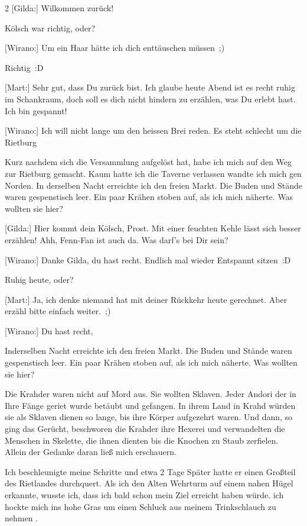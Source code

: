 \documentclass[10pt, a4paper, oneside]{book}
\begin{document}
\begin{multicols}{2}
[Gilda:] Wilkommen zurück!

Kölsch war richtig, oder?

[Wirano:] Um ein Haar hätte ich dich enttäuschen müssen ;)

Richtig :D

[Mart:] Sehr gut, dass Du zurück bist. Ich glaube heute Abend ist es recht ruhig im Schankraum, doch soll es dich nicht hindern zu erzählen, was Du erlebt hast. Ich bin gespannt!

[Wirano:] Ich will nicht lange um den heissen Brei reden. Es steht schlecht um die Rietburg

Kurz nachdem sich die Versammlung aufgelöst hat, habe ich mich auf den Weg zur Rietburg gemacht. Kaum hatte ich die Taverne verlassen wandte ich mich gen Norden. In derselben Nacht erreichte ich den freien Markt. Die Buden und Stände waren gespenstisch leer. Ein paar Krähen stoben auf, als ich mich näherte. Was wollten sie hier?

[Gilda:] Hier kommt dein Kölsch, Prost. Mit einer feuchten Kehle lässt sich besser erzählen!
Ahh, Fenn-Fan ist auch da. Was darf's bei Dir sein?

[Wirano:] Danke Gilda, du hast recht. Endlich mal wieder Entspannt sitzen :D

Ruhig heute, oder?

[Mart:] Ja, ich denke niemand hat mit deiner Rückkehr heute gerechnet. Aber erzähl bitte einfach weiter. ;)

[Wirano:] Du hast recht,

Inderselben Nacht erreichte ich den freien Markt. Die Buden und Stände waren gespenstisch leer. Ein paar Krähen stoben auf, als ich mich näherte. Was wollten sie hier?

Die Krahder waren nicht auf Mord aus. Sie wollten Sklaven. Jeder Andori der in Ihre Fänge geriet wurde betäubt und gefangen. In ihrem Land in Krahd würden sie als Sklaven dienen so lange, bis ihre Körper aufgezehrt waren. Und dann, so ging das Gerücht, beschworen die Krahder ihre Hexerei und verwandelten die Menschen in Skelette, die ihnen dienten bis die Knochen zu Staub zerfielen. Allein der Gedanke daran ließ mich erschauern.

Ich beschleunigte meine Schritte und etwa 2 Tage Später hatte er einen Großteil des Rietlandes durchquert. Als ich den Alten Wehrturm auf einem nahen Hügel erkannte, wusste ich, dass ich bald schon mein Ziel erreicht haben würde. ich hockte mich ins hohe Gras um einen Schluck aus meinem Trinkschlauch zu nehmen .


\end{multicols}
\end{document}
